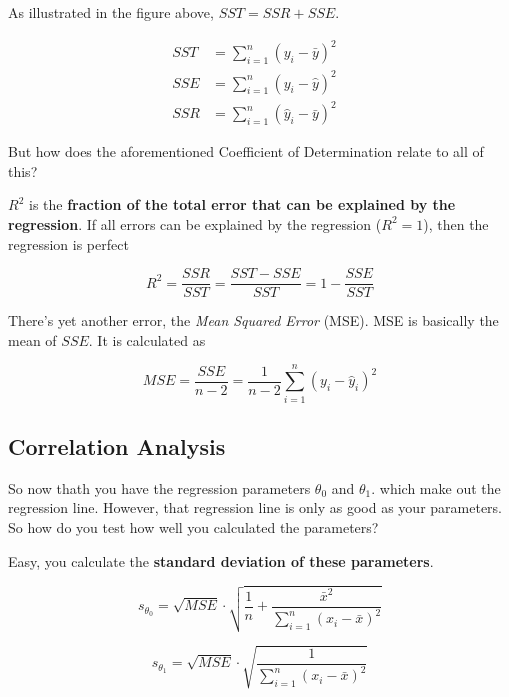 \documentclass[a4paper, 11pt]{article}
\begin{document}
\vspace{10px}

As illustrated in the figure above, $SST = SSR + SSE$.

\begin{align}
    SST &= \sum^{n}_{i=1}(y_{i}-\bar y)^2\\
    SSE &= \sum^{n}_{i=1}(y_{i}-\hat y)^2 &\\
    SSR &= \sum^{n}_{i=1}(\hat y_{i}-\bar y)^2
\end{align}


But how does the aforementioned Coefficient of Determination relate to all of this? 

$R^2$ is the \textbf{fraction of the total error that can be explained by the regression}. If all errors can be explained by the regression ($R^2 = 1$), then the regression is perfect

\begin{equation}
	 R^2 = \frac{SSR}{SST} = \frac{SST-SSE}{SST} = 1 - \frac{SSE}{SST}
\end{equation}

\vspace{10px}

There's yet another error, the \textit{Mean Squared Error} (MSE). MSE is basically the mean of $SSE$. It is calculated as

\begin{equation}
	MSE = \frac{SSE}{n-2} = \frac{1}{n-2}\sum_{i=1}^{n}(y_{i}-\hat{y}^{}_{i})^2
\end{equation}

\newpage

\subsection{Correlation Analysis}

So now thath you have the regression parameters $\theta^{}_{0}$ and $\theta^{}_{1}$. which make out the regression line. However, that regression line is only as good as your parameters. So how do you test how well you calculated the parameters?

Easy, you calculate the \textbf{standard deviation of these parameters}.

\begin{equation}
	s_{\theta_{0}} = \sqrt{MSE} \cdot \sqrt{\frac{1}{n} + \frac{\bar{x}^2}{\sum_{i=1}^{n}{(x_i-\bar{x})^2}}}
\end{equation}

\begin{equation}
	s_{\theta_{1}} = \sqrt{MSE}\cdot \sqrt{\frac{1}{\sum_{i=1}^{n}{(x_i-\bar{x})^2}}}
\end{equation}
\end{document}
